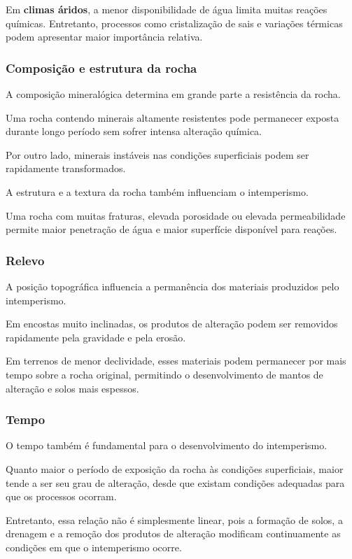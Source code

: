 \documentclass[a4paper,12pt]{article}
\theoremstyle{definition}
\theoremstyle{definition}
\theoremstyle{definition}
\begin{document}
Em \textbf{climas áridos}, a menor disponibilidade de água limita muitas reações químicas. Entretanto, processos como cristalização de sais e variações térmicas podem apresentar maior importância relativa.

\subsubsection{Composição e estrutura da rocha}

A composição mineralógica determina em grande parte a resistência da rocha.

Uma rocha contendo minerais altamente resistentes pode permanecer exposta durante longo período sem sofrer intensa alteração química.

Por outro lado, minerais instáveis nas condições superficiais podem ser rapidamente transformados.

A estrutura e a textura da rocha também influenciam o intemperismo.

Uma rocha com muitas fraturas, elevada porosidade ou elevada permeabilidade permite maior penetração de água e maior superfície disponível para reações.

\subsubsection{Relevo}

A posição topográfica influencia a permanência dos materiais produzidos pelo intemperismo.

Em encostas muito inclinadas, os produtos de alteração podem ser removidos rapidamente pela gravidade e pela erosão.

Em terrenos de menor declividade, esses materiais podem permanecer por mais tempo sobre a rocha original, permitindo o desenvolvimento de mantos de alteração e solos mais espessos.

\subsubsection{Tempo}

O tempo também é fundamental para o desenvolvimento do intemperismo.

Quanto maior o período de exposição da rocha às condições superficiais, maior tende a ser seu grau de alteração, desde que existam condições adequadas para que os processos ocorram.

Entretanto, essa relação não é simplesmente linear, pois a formação de solos, a drenagem e a remoção dos produtos de alteração modificam continuamente as condições em que o intemperismo ocorre.
\end{document}
